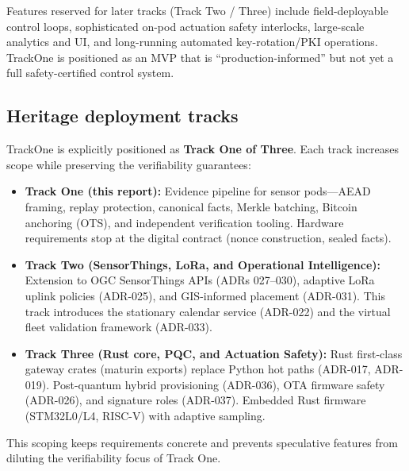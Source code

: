 Features reserved for later tracks (Track Two / Three) include field-deployable control loops, sophisticated on-pod actuation safety interlocks, large-scale analytics and UI, and long-running automated key-rotation/\ac{PKI} operations.
TrackOne is positioned as an \ac{MVP} that is ``production-informed'' but not yet a full safety-certified control system.

\subsection{Heritage deployment tracks}\label{subsec:heritage-deployment-tracks}
TrackOne is explicitly positioned as \textbf{Track One of Three}.
Each track increases scope while preserving the verifiability guarantees:
\begin{itemize}[nosep]
  \item \textbf{Track One (this report):} Evidence pipeline for sensor pods---\ac{AEAD} framing, replay protection, canonical facts, Merkle batching, Bitcoin anchoring (\ac{OTS}), and independent verification tooling.
  Hardware requirements stop at the digital contract (nonce construction, sealed facts).
  \item \textbf{Track Two (SensorThings, LoRa, and Operational Intelligence):} Extension to \ac{OGC} SensorThings \ac{API}s (\ac{ADR}s 027--030), adaptive \ac{LoRa} uplink policies (\ac{ADR}-025), and \ac{GIS}-informed placement (\ac{ADR}-031).
  This track introduces the stationary calendar service (\ac{ADR}-022) and the virtual fleet validation framework (\ac{ADR}-033).
  \item \textbf{Track Three (Rust core, PQC, and Actuation Safety):} Rust first-class gateway crates (maturin exports) replace Python hot paths (\ac{ADR}-017, \ac{ADR}-019).
  Post-quantum hybrid provisioning (\ac{ADR}-036), OTA firmware safety (\ac{ADR}-026), and signature roles (\ac{ADR}-037).
  Embedded Rust firmware (STM32L0/L4, RISC-V) with adaptive sampling.
\end{itemize}
This scoping keeps requirements concrete and prevents speculative features from diluting the verifiability focus of Track One.

